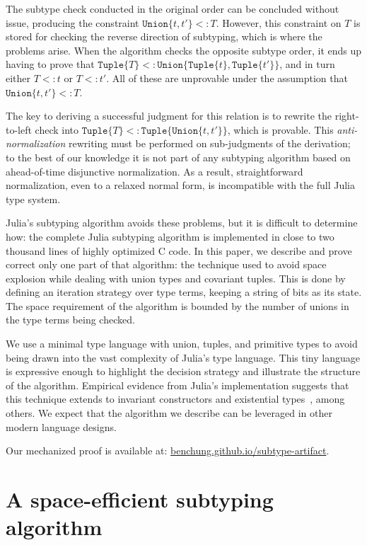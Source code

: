 \documentclass[a4paper,english]{lipics-v2019}
\newcommand{\xt}[1]{\texttt{#1}}
\newcommand{\union}[2]{\xt{Union\{}#1,#2\xt{\}}}
\newcommand{\tuple}[1]{\xt{Tuple\{}#1\xt{\}}}
\begin{document}
The subtype check conducted in the original order can be concluded without
issue, producing the constraint {\small$\union{t}{t'} <: T$}. However, this
constraint on $T$ is stored for checking the reverse direction of subtyping,
which is where the problems arise. When the algorithm checks the opposite
subtype order, it ends up having to prove that
{\small$\tuple{T}<:\union{\tuple{t}}{\tuple{t'}}$}, and in turn either
{\small$T<:t$} or {\small$T<:t'$}. All of these are unprovable under the
assumption that {\small$\union{t}{t'} <: T$}.

The key to deriving a successful judgment for this relation is to rewrite the
right-to-left check into {\small$\tuple{T}<:\tuple{\union{t}{t'}}$}, which is
provable. This \emph{anti-normalization} rewriting must be performed on
sub-judgments of the derivation; to the best of our knowledge it is not
part of any subtyping algorithm based on ahead-of-time disjunctive
normalization. As a result, straightforward normalization, even to a relaxed
normal form, is incompatible with the full Julia type system.

Julia's subtyping algorithm avoids these problems, but it is difficult to
determine how: the complete Julia subtyping algorithm is implemented in close to
two thousand lines of highly optimized C code. In this paper, we describe and
prove correct only one part of that algorithm: the technique used to avoid
space explosion while dealing with union types and covariant tuples. This is
done by defining an iteration strategy over type terms, keeping a string of
bits as its state. The space requirement of the algorithm is bounded by the
number of unions in the type terms being checked.

We use a minimal type language with union, tuples, and primitive types to
avoid being drawn into the vast complexity of Julia's type language. This tiny
language is expressive enough to highlight the decision strategy and
illustrate the structure of the algorithm. Empirical evidence from Julia's
implementation suggests that this technique extends to invariant constructors
and existential types~\cite{DBLP:NardelliBPCBV18}, among others. We expect
that the algorithm we describe can be leveraged in other modern language
designs.

\medskip
Our mechanized proof is available at: {\small\url{benchung.github.io/subtype-artifact}}.

\section{A space-efficient subtyping algorithm}
\end{document}
